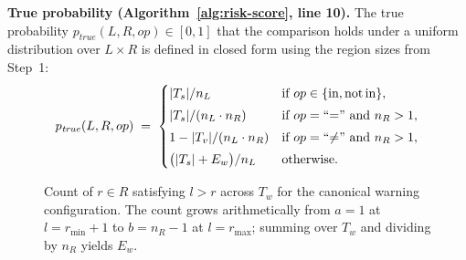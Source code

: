 \documentclass[pdflatex,sn-basic]{sn-jnl}%
\theoremstyle{thmstyleone}%
\theoremstyle{thmstyletwo}%
\theoremstyle{thmstylethree}%
\begin{document}
\smallskip
\textbf{True probability (Algorithm~\ref{alg:risk-score}, line 10).}
The true probability $p_{\mathit{true}}(L, R, op) \in [0, 1]$ that the comparison holds under a uniform distribution over $L \times R$ is defined in closed form using the region sizes from Step~1:
\[
p_{\mathit{true}}(L, R, op) \;=\;
\begin{cases}
|T_s| / n_L & \text{if } op \in \{\text{in}, \text{not\,in}\}, \\[3pt]
|T_s| / (n_L \cdot n_R) & \text{if } op = \text{``=''} \text{ and } n_R > 1, \\[3pt]
1 - |T_v| / (n_L \cdot n_R) & \text{if } op = \text{``$\neq$''} \text{ and } n_R > 1, \\[3pt]
\bigl(|T_s| + E_w\bigr) / n_L & \text{otherwise.}
\end{cases}
\]

\begin{figure}[t]
\centering
\vspace{4pt}

\vspace{6pt}
\caption{Count of $r \in R$ satisfying $l > r$ across $T_w$ for the canonical warning configuration. The count grows arithmetically from $a = 1$ at $l = r_{\min}{+}1$ to $b = n_R - 1$ at $l = r_{\max}$; summing over $T_w$ and dividing by $n_R$ yields $E_w$.}
\label{fig:arithmetic-series}
\vspace{4pt}
\end{figure}
\end{document}
